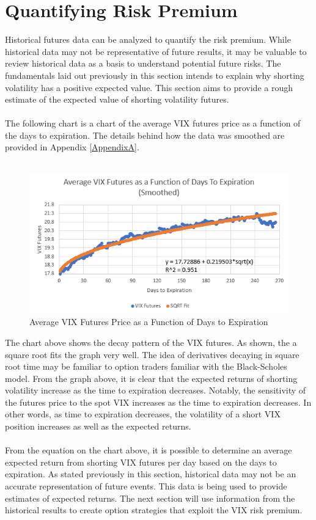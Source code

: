 \documentclass[11pt, oneside]{book}
\begin{document}
\section{Quantifying Risk Premium} \label{Futures-Quantify}
Historical futures data can be analyzed to quantify the risk premium. While historical data may not be representative of future results, it may be valuable to review historical data as a basis to understand potential future risks. The fundamentals laid out previously in this section intends to explain why shorting volatility has a positive expected value. This section aims to provide a rough estimate of the expected value of shorting volatility futures. \\
\\
The following chart is a chart of the average VIX futures price as a function of the days to expiration. The details behind how the data was smoothed are provided in Appendix \ref{AppendixA}. 
\\
\\
\begin{figure}[H]
\centering
\includegraphics[width=\textwidth]{VIXFuturesAsAFunctionOfDaysToExpiration.png}
\caption{Average VIX Futures Price as a Function of Days to Expiration} \label{Fig-AvgVIXDaysToExpiration}
\end{figure}
\noindent
The chart above shows the decay pattern of the VIX futures. As shown, the a square root fits the graph very well. The idea of derivatives decaying in square root time may be familiar to option traders familiar with the Black-Scholes model. From the graph above, it is clear that the expected returns of shorting volatility increase as the time to expiration decreases. Notably, the sensitivity of the futures price to the spot VIX increases as the time to expiration decreases. In other words, as time to expiration decreases, the volatility of a short VIX position increases as well as the expected returns.\\
\\
From the equation on the chart above, it is possible to determine an average expected return from shorting VIX futures per day based on the days to expiration. As stated previously in this section, historical data may not be an accurate representation of future events. This data is being used to provide estimates of expected returns. The next section will use information from the historical results to create option strategies that exploit the VIX risk premium.
\end{document}

